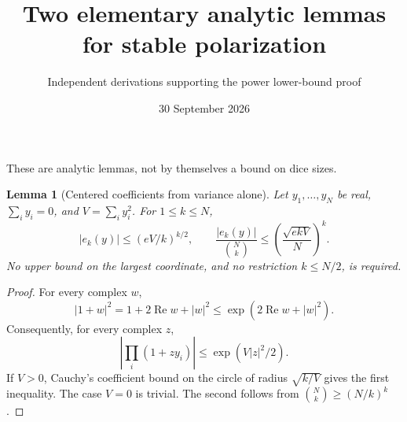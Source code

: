 \documentclass[11pt]{article}
\title{Two elementary analytic lemmas for stable polarization}
\author{Independent derivations supporting the power lower-bound proof}
\date{30 September 2026}
\newtheorem{lemma}{Lemma}
\begin{document}
\maketitle
These are analytic lemmas, not by themselves a bound on dice sizes.

\begin{lemma}[Centered coefficients from variance alone]
Let $y_1,\ldots,y_N$ be real, $\sum_i y_i=0$, and
$V=\sum_i y_i^2$. For $1\le k\le N$,
\[
 |e_k(y)|\le(eV/k)^{k/2},\qquad
 \frac{|e_k(y)|}{\binom Nk}
       \le\left(\frac{\sqrt{ekV}}{N}\right)^k.
\]
No upper bound on the largest coordinate, and no restriction
$k\le N/2$, is required.
\end{lemma}
\begin{proof}
For every complex $w$,
\[
 |1+w|^2=1+2\operatorname{Re}w+|w|^2
       \le\exp(2\operatorname{Re}w+|w|^2).
\]
Consequently, for every complex $z$,
\[
 \left|\prod_i(1+zy_i)\right|\le\exp(V|z|^2/2).
\]
If $V>0$, Cauchy's coefficient bound on the circle of radius
$\sqrt{k/V}$ gives the first inequality. The case $V=0$ is trivial.
The second follows from $\binom Nk\ge(N/k)^k$.
\end{proof}
\end{document}

